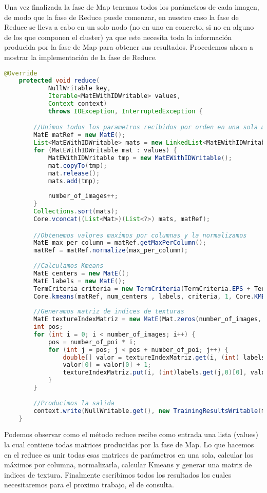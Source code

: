Una vez finalizada la fase de Map tenemos todos los parámetros de cada imagen, de modo que la fase de Reduce puede comenzar, en nuestro caso la fase de Reduce se lleva a cabo en un solo nodo (no en uno en concreto, si no en alguno de los que componen el cluster) ya que este necesita toda la información producida por la fase de Map para obtener sus resultados. Procedemos ahora a mostrar la implementación de la fase de Reduce.

 \begin{lstlisting}[language=Java]
@Override
	protected void reduce(
			NullWritable key,
			Iterable<MatEWithIDWritable> values,
			Context context)
			throws IOException, InterruptedException {

		//Unimos todos los parametros recibidos por orden en una sola matriz
		MatE matRef = new MatE();
		List<MatEWithIDWritable> mats = new LinkedList<MatEWithIDWritable>();
		for (MatEWithIDWritable mat : values) {
			MatEWithIDWritable tmp = new MatEWithIDWritable();
			mat.copyTo(tmp);
			mat.release();
			mats.add(tmp);
			
			number_of_images++;
		}
		Collections.sort(mats);
		Core.vconcat((List<Mat>)(List<?>) mats, matRef);

		//Obtenemos valores maximos por columnas y la normalizamos
		MatE max_per_column = matRef.getMaxPerColumn();
		matRef = matRef.normalize(max_per_column);
		
		//Calculamos Kmeans
		MatE centers = new MatE();
		MatE labels = new MatE();
		TermCriteria criteria = new TermCriteria(TermCriteria.EPS + TermCriteria.MAX_ITER, 10000, 0.0001);
		Core.kmeans(matRef, num_centers , labels, criteria, 1, Core.KMEANS_RANDOM_CENTERS, centers);
		
		//Generamos matriz de indices de texturas
		MatE textureIndexMatriz = new MatE(Mat.zeros(number_of_images, num_centers, CvType.CV_32F));
		int pos;
		for (int i = 0; i < number_of_images; i++) {
			pos = number_of_poi * i;
			for (int j = pos; j < pos + number_of_poi; j++) {
				double[] valor = textureIndexMatriz.get(i, (int) labels.get(j, 0)[0]);
				valor[0] = valor[0] + 1;
				textureIndexMatriz.put(i, (int)labels.get(j,0)[0], valor);
			}
		}
		
		//Producimos la salida
		context.write(NullWritable.get(), new TrainingResultsWritable(max_per_column, centers, textureIndexMatriz));
	}
\end{lstlisting}

Podemos observar como el método reduce recibe como entrada una lista (values) la cual contiene todas matrices producidas por la fase de Map. Lo que hacemos en el reduce es unir todas esas matrices de parámetros en una sola, calcular los máximos por columna, normalizarla, calcular Kmeans y generar una matriz de indices de textura. Finalmente escribimos todos los resultados los cuales necesitaremos para el proximo trabajo, el de consulta.


